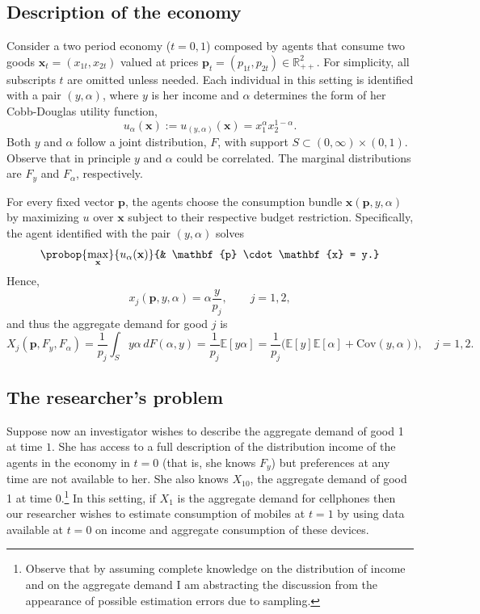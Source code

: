 \documentclass[english, a4paper,12pt]{article}
\begin{document}
\subsection{Description of the economy} \label{ssec:RepAgDescr}
Consider a two period economy ($t = 0,1$) composed by agents that consume two goods $\mathbf{x}_{t} = (x_{1t}, x_{2t})$ valued at prices $\mathbf{p}_{t} = (p_{1t}, p_{2t}) \in \mathbb{R}^{2}_{++}$. For simplicity, all subscripts $t$ are omitted unless needed. Each individual in this setting is identified with a pair $(y,\alpha)$, where $y$ is her income and $\alpha$ determines the form of her Cobb-Douglas utility function,
	$$u_{\alpha}(\mathbf{x}) := u_{(y,\alpha)}(\mathbf{x}) = x_{1}^{\alpha}x_{2}^{1-\alpha}.$$
Both $y$ and $\alpha$ follow a joint distribution, $F$, with support $S \subset (0,\infty) \times (0,1)$. Observe that in principle $y$ and $\alpha$ could be correlated. The marginal distributions are $F_{y}$ and $F_{\alpha}$, respectively. 

For every fixed vector $\mathbf{p}$, the agents choose the consumption bundle $\mathbf{x}(\mathbf{p}, y, \alpha)$ by maximizing $u$ over $\mathbf{x}$ subject to their respective budget restriction. Specifically, the agent identified with the pair $(y,\alpha)$ solves
	$$\probop{\max_{\mathbf{x}}}{u_{\alpha}(\mathbf{x})}
							{&	\mathbf{p} \cdot \mathbf{x} = y.}$$ 
Hence,
	$$x_{j}(\mathbf{p}, y, \alpha) = \alpha \frac{y}{p_{j}}, \qquad j = 1,2,$$
and thus the aggregate demand for good $j$ is
	$$X_{j}(\mathbf{p}, F_{y}, F_{\alpha})
		= \frac{1}{p_{j}} \int_{S} y\alpha \,dF(\alpha,y)
		= \frac{1}{p_{j}}\mathbb{E}[y\alpha]
		= \frac{1}{p_{j}}\Big(\mathbb{E}[y]\mathbb{E}[\alpha] + \mathrm{Cov}(y,\alpha)\Big), \quad j = 1,2.
	$$

\subsection{The researcher's problem} \label{ssec:RepAgProblem}
Suppose now an investigator wishes to describe the aggregate demand of good 1 at time $1$. She has access to a full description of the distribution income of the agents in the economy in $t = 0$ (that is, she knows $F_{y}$) but preferences at any time are not available to her. She also knows $X_{10}$, the aggregate demand of good 1 at time $0$.\footnote{Observe that by assuming complete knowledge on the distribution of income and on the aggregate demand I am abstracting the discussion from the appearance of possible estimation errors due to sampling.} In this setting, if $X_{1}$ is the aggregate demand for cellphones then our researcher wishes to estimate consumption of mobiles at $t=1$ by using data available at $t=0$ on income and aggregate consumption of these devices.
\end{document}
